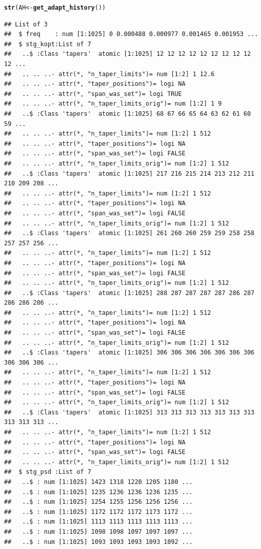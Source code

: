 \documentclass[10pt]{article}\usepackage{graphicx, color}
\makeatletter
\newcommand{\hlfunctioncall}[1]{\textcolor[rgb]{0.501960784313725,0,0.329411764705882}{\textbf{#1}}}%
\newenvironment{kframe}{%
 \def\at@end@of@kframe{}%
 \ifinner\ifhmode%
  \def\at@end@of@kframe{\end{minipage}}%
  \begin{minipage}{\columnwidth}%
 \fi\fi%
 \def\FrameCommand##1{\hskip\@totalleftmargin \hskip-\fboxsep
 \colorbox{shadecolor}{##1}\hskip-\fboxsep
     \hskip-\linewidth \hskip-\@totalleftmargin \hskip\columnwidth}%
 \MakeFramed {\advance\hsize-\width
   \@totalleftmargin\z@ \linewidth\hsize
   \@setminipage}}%
 {\par\unskip\endMakeFramed%
 \at@end@of@kframe}
\newenvironment{knitrout}{}{} %
\makeatother
\begin{document}
\begin{knitrout}
\begin{kframe}
{\ttfamily\noindent\itshape\color{messagecolor}{\#\# Normalized\ \ single-sided PSD\ \ (PSD)\ \ to single-sided PSD for sampling-freq.\ \ 1}}\begin{alltt}
\hlfunctioncall{str}(AH <- \hlfunctioncall{get_adapt_history}())
\end{alltt}
\begin{verbatim}
## List of 3
##  $ freq    : num [1:1025] 0 0.000488 0.000977 0.001465 0.001953 ...
##  $ stg_kopt:List of 7
##   ..$ :Class 'tapers'  atomic [1:1025] 12 12 12 12 12 12 12 12 12 12 ...
##   .. .. ..- attr(*, "n_taper_limits")= num [1:2] 1 12.6
##   .. .. ..- attr(*, "taper_positions")= logi NA
##   .. .. ..- attr(*, "span_was_set")= logi TRUE
##   .. .. ..- attr(*, "n_taper_limits_orig")= num [1:2] 1 9
##   ..$ :Class 'tapers'  atomic [1:1025] 68 67 66 65 64 63 62 61 60 59 ...
##   .. .. ..- attr(*, "n_taper_limits")= num [1:2] 1 512
##   .. .. ..- attr(*, "taper_positions")= logi NA
##   .. .. ..- attr(*, "span_was_set")= logi FALSE
##   .. .. ..- attr(*, "n_taper_limits_orig")= num [1:2] 1 512
##   ..$ :Class 'tapers'  atomic [1:1025] 217 216 215 214 213 212 211 210 209 208 ...
##   .. .. ..- attr(*, "n_taper_limits")= num [1:2] 1 512
##   .. .. ..- attr(*, "taper_positions")= logi NA
##   .. .. ..- attr(*, "span_was_set")= logi FALSE
##   .. .. ..- attr(*, "n_taper_limits_orig")= num [1:2] 1 512
##   ..$ :Class 'tapers'  atomic [1:1025] 261 260 260 259 259 258 258 257 257 256 ...
##   .. .. ..- attr(*, "n_taper_limits")= num [1:2] 1 512
##   .. .. ..- attr(*, "taper_positions")= logi NA
##   .. .. ..- attr(*, "span_was_set")= logi FALSE
##   .. .. ..- attr(*, "n_taper_limits_orig")= num [1:2] 1 512
##   ..$ :Class 'tapers'  atomic [1:1025] 288 287 287 287 287 286 287 286 286 286 ...
##   .. .. ..- attr(*, "n_taper_limits")= num [1:2] 1 512
##   .. .. ..- attr(*, "taper_positions")= logi NA
##   .. .. ..- attr(*, "span_was_set")= logi FALSE
##   .. .. ..- attr(*, "n_taper_limits_orig")= num [1:2] 1 512
##   ..$ :Class 'tapers'  atomic [1:1025] 306 306 306 306 306 306 306 306 306 306 ...
##   .. .. ..- attr(*, "n_taper_limits")= num [1:2] 1 512
##   .. .. ..- attr(*, "taper_positions")= logi NA
##   .. .. ..- attr(*, "span_was_set")= logi FALSE
##   .. .. ..- attr(*, "n_taper_limits_orig")= num [1:2] 1 512
##   ..$ :Class 'tapers'  atomic [1:1025] 313 313 313 313 313 313 313 313 313 313 ...
##   .. .. ..- attr(*, "n_taper_limits")= num [1:2] 1 512
##   .. .. ..- attr(*, "taper_positions")= logi NA
##   .. .. ..- attr(*, "span_was_set")= logi FALSE
##   .. .. ..- attr(*, "n_taper_limits_orig")= num [1:2] 1 512
##  $ stg_psd :List of 7
##   ..$ : num [1:1025] 1423 1318 1220 1205 1180 ...
##   ..$ : num [1:1025] 1235 1236 1236 1236 1235 ...
##   ..$ : num [1:1025] 1254 1255 1256 1256 1256 ...
##   ..$ : num [1:1025] 1172 1172 1172 1173 1172 ...
##   ..$ : num [1:1025] 1113 1113 1113 1113 1113 ...
##   ..$ : num [1:1025] 1098 1098 1097 1097 1097 ...
##   ..$ : num [1:1025] 1093 1093 1093 1093 1092 ...
\end{verbatim}
\end{kframe}
\end{knitrout}
\end{document}

